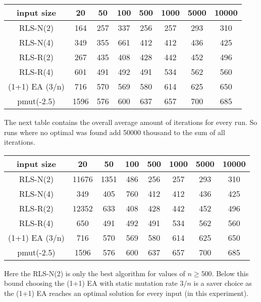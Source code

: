 \begin{tabular}{cccccccc}
      input size    & 20   & 50  & 100 & 500 & 1000 & 5000 & 10000 \\\hline
      RLS-N(2)      & 164  & 257 & 337 & 256 & 257  & 293  & 310   \\
      RLS-N(4)      & 349  & 355 & 661 & 412 & 412  & 436  & 425   \\
      RLS-R(2)      & 267  & 435 & 408 & 428 & 442  & 452  & 496   \\
      RLS-R(4)      & 601  & 491 & 492 & 491 & 534  & 562  & 560   \\
      (1+1) EA (3/n) & 716  & 570 & 569 & 580 & 614  & 625  & 650   \\
      pmut(-2.5)    & 1596 & 576 & 600 & 637 & 657  & 700  & 685   \\
\end{tabular}

The next table contains the overall average amount of iterations for every run.
So runs where no optimal was found add 50000 thousand to the sum of all iterations.

\begin{tabular}{cccccccc}
      input size    & 20    & 50   & 100 & 500 & 1000 & 5000 & 10000 \\\hline
      RLS-N(2)      & 11676 & 1351 & 486 & 256 & 257  & 293  & 310   \\
      RLS-N(4)      & 349   & 405  & 760 & 412 & 412  & 436  & 425   \\
      RLS-R(2)      & 12352 & 633  & 408 & 428 & 442  & 452  & 496   \\
      RLS-R(4)      & 650   & 491  & 492 & 491 & 534  & 562  & 560   \\
      (1+1) EA (3/n) & 716   & 570  & 569 & 580 & 614  & 625  & 650   \\
      pmut(-2.5)    & 1596  & 576  & 600 & 637 & 657  & 700  & 685   \\
\end{tabular}

Here the RLS-N(2) is only the best algorithm for values of $n \ge 500$.
Below this bound choosing the (1+1) EA with static mutation rate $3/n$ is a saver choice as the (1+1) EA reaches an optimal solution for every input (in this experiment).